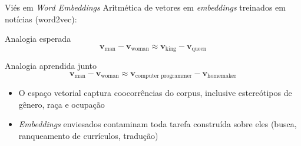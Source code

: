 \documentclass[aspectratio=169,xcolor=dvipsnames]{beamer}
\begin{document}
  \begin{frame}{Viés em \textit{Word Embeddings}}
    Aritmética de vetores em \textit{embeddings} treinados em notícias (word2vec):
    \begin{block}{Analogia esperada}
      \[
        \mathbf{v}_{\text{man}} - \mathbf{v}_{\text{woman}} \approx \mathbf{v}_{\text{king}} - \mathbf{v}_{\text{queen}}
      \]
    \end{block}

    \begin{alertblock}{Analogia aprendida junto}
      \[
        \mathbf{v}_{\text{man}} - \mathbf{v}_{\text{woman}} \approx \mathbf{v}_{\text{computer programmer}} - \mathbf{v}_{\text{homemaker}}
      \]
    \end{alertblock}

    \vspace{0.3em}
    \begin{itemize}\setlength{\itemsep}{0.2em}
      \item O espaço vetorial captura coocorrências do corpus, inclusive estereótipos de gênero, raça e ocupação
      \item \textit{Embeddings} enviesados contaminam toda tarefa construída sobre eles (busca, ranqueamento de currículos, tradução)
    \end{itemize}
  \end{frame}
\end{document}
